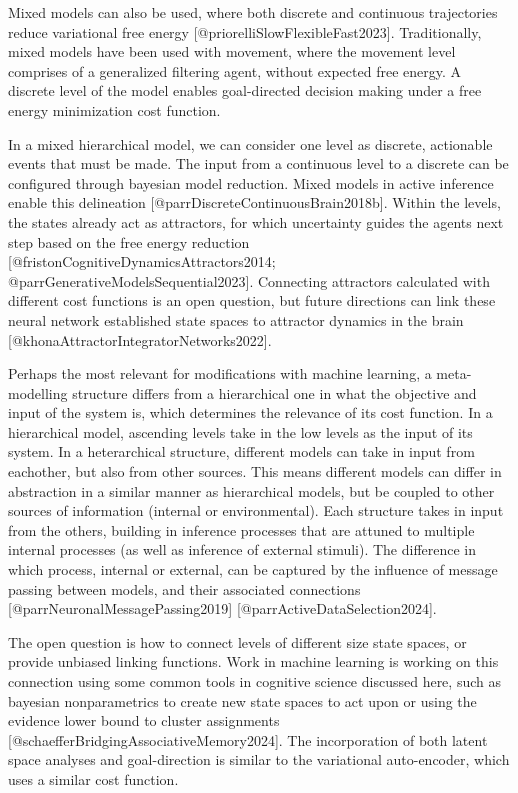 \documentclass{article}
\begin{document}
Mixed models can also be used, where both discrete and continuous trajectories reduce variational free energy [@priorelliSlowFlexibleFast2023]. Traditionally, mixed models have been used with movement, where the movement level comprises of a generalized filtering agent, without expected free energy. A discrete level of the model enables goal-directed decision making under a free energy minimization cost function.

In a mixed hierarchical model, we can consider one level as discrete, actionable events that must be made. The input from a continuous level to a discrete can be configured through bayesian model reduction. Mixed models in active inference enable this delineation [@parrDiscreteContinuousBrain2018b]. Within the levels, the states already act as attractors, for which uncertainty guides the agents next step based on the free energy reduction [@fristonCognitiveDynamicsAttractors2014; @parrGenerativeModelsSequential2023]. Connecting attractors calculated with different cost functions is an open question, but future directions can link these neural network established state spaces to attractor dynamics in the brain [@khonaAttractorIntegratorNetworks2022].

Perhaps the most relevant for modifications with machine learning, a meta-modelling structure differs from a hierarchical one in what the objective and input of the system is, which determines the relevance of its cost function. In a hierarchical model, ascending levels take in the low levels as the input of its system. In a heterarchical structure, different models can take in input from eachother, but also from other sources. This means different models can differ in abstraction in a similar manner as hierarchical models, but be coupled to other sources of information (internal or environmental). Each structure takes in input from the others, building in inference processes that are attuned to multiple internal processes (as well as inference of external stimuli). The difference in which process, internal or external, can be captured by the influence of message passing between models, and their associated connections [@parrNeuronalMessagePassing2019] [@parrActiveDataSelection2024].

The open question is how to connect levels of different size state spaces, or provide unbiased linking functions. Work in machine learning is working on this connection using some common tools in cognitive science discussed here, such as bayesian nonparametrics to create new state spaces to act upon or using the evidence lower bound to cluster assignments [@schaefferBridgingAssociativeMemory2024]. The incorporation of both latent space analyses and goal-direction is similar to the variational auto-encoder, which uses a similar cost function.
\end{document}
